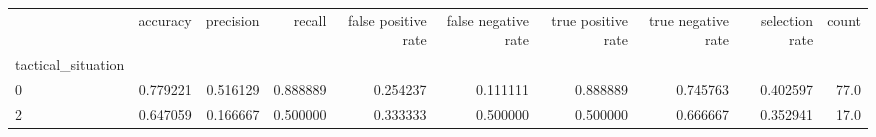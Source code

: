 \begin{tabular}{lrrrrrrrrr}
\toprule
{} &  accuracy &  precision &    recall &  false positive rate &  false negative rate &  true positive rate &  true negative rate &  selection rate &  count \\
tactical\_situation &           &            &           &                      &                      &                     &                     &                 &        \\
\midrule
0                  &  0.779221 &   0.516129 &  0.888889 &             0.254237 &             0.111111 &            0.888889 &            0.745763 &        0.402597 &   77.0 \\
2                  &  0.647059 &   0.166667 &  0.500000 &             0.333333 &             0.500000 &            0.500000 &            0.666667 &        0.352941 &   17.0 \\
\bottomrule
\end{tabular}
